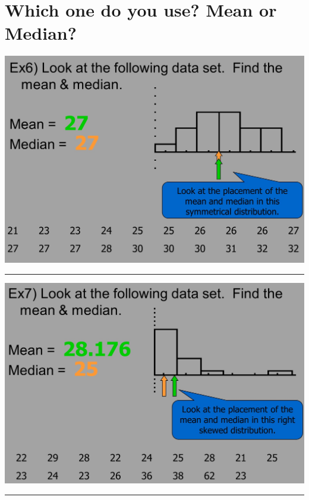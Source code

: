 \documentclass[]{book}
\begin{document}
\hypertarget{which-one-do-you-use-mean-or-median}{%
\section{Which one do you use? Mean or Median?}\label{which-one-do-you-use-mean-or-median}}

\includegraphics{pic5.jpg}

\begin{center}\rule{0.5\linewidth}{\linethickness}\end{center}

\includegraphics{pic6.jpg}

\begin{center}\rule{0.5\linewidth}{\linethickness}\end{center}
\end{document}
